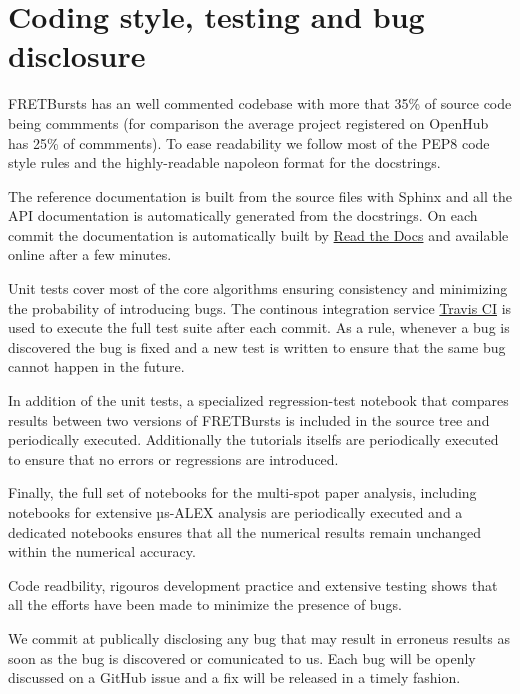 \section{Coding style, testing and bug disclosure}

FRETBursts has an well commented codebase with more that 35\% of source code
being commments (for comparison the average project registered on OpenHub has 25\%
of commments). To ease readability we follow most of the PEP8 code style rules and the highly-readable napoleon format for the docstrings.

The reference documentation is built from the source files with Sphinx and
all the API documentation is automatically generated from the docstrings.
On each commit the documentation is automatically built by 
\href{https://readthedocs.org/}{Read the Docs}
and available online after a few minutes.

Unit tests cover most of the core algorithms ensuring consistency and 
minimizing the probability of introducing bugs. The continous integration
service \href{http://travis-ci.org}{Travis CI} is used to execute the full
test suite after each commit.
As a rule, whenever a bug is discovered the bug is fixed and a new test is 
written to ensure that the same bug cannot happen in the future.

In addition of the unit tests, a specialized regression-test notebook
that compares results between two versions of FRETBursts is
included in the source tree and periodically executed. Additionally
the tutorials itselfs are periodically executed to ensure that
no errors or regressions are introduced.

Finally, the full set of notebooks for the multi-spot paper analysis,
including notebooks for extensive µs-ALEX analysis are periodically
executed and a dedicated notebooks ensures that all the numerical
results remain unchanged within the numerical accuracy.

Code readbility, rigouros development practice and extensive testing
shows that all the efforts have been made to minimize the presence 
of bugs.

We commit at publically disclosing any bug that may result in erroneus results 
as soon as the bug is discovered or comunicated to us.
Each bug will be openly discussed on a GitHub issue and a fix will be released 
in a timely fashion.
